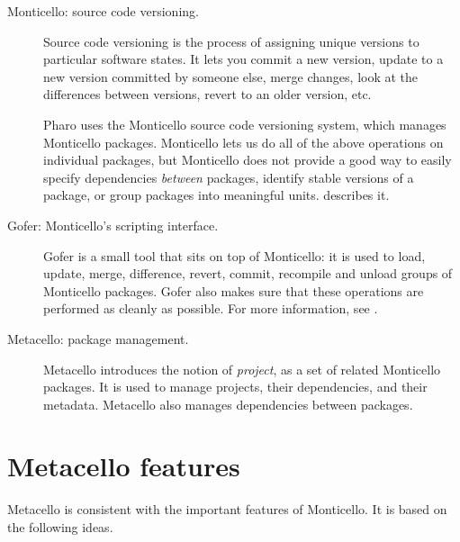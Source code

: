 \documentclass[a4paper,10pt,twoside]{book}
\begin{document}
\begin{description}

\item[Monticello: source code versioning.]
Source code versioning is the process of assigning unique versions to particular software states.  It lets you commit a new version, update to a new version committed by someone else, merge changes, look at the differences between versions,  revert to an older version, etc.

Pharo uses the Monticello source code versioning system, which manages Monticello packages.  Monticello lets us do all of the above operations on individual packages, but Monticello does not provide a good way to easily specify dependencies \emph{between} packages, identify stable versions of a package, or group packages into meaningful units.  describes it.

\item[Gofer: Monticello's scripting interface.]
Gofer is a small tool that sits on top of Monticello: it is used to load, update, merge, difference, revert, commit, recompile and unload groups of Monticello packages. Gofer also makes sure that these operations are performed as cleanly as possible.
For more information, see .



\item[Metacello: package management.] Metacello introduces the notion of \emph{project}, as a set of related Monticello packages. It is used to manage projects,   their dependencies, and their metadata.
Metacello also manages dependencies between packages.
\end{description}




\section{Metacello features}

Metacello is consistent with the important features of Monticello. It is based on the following ideas.
\end{document}
